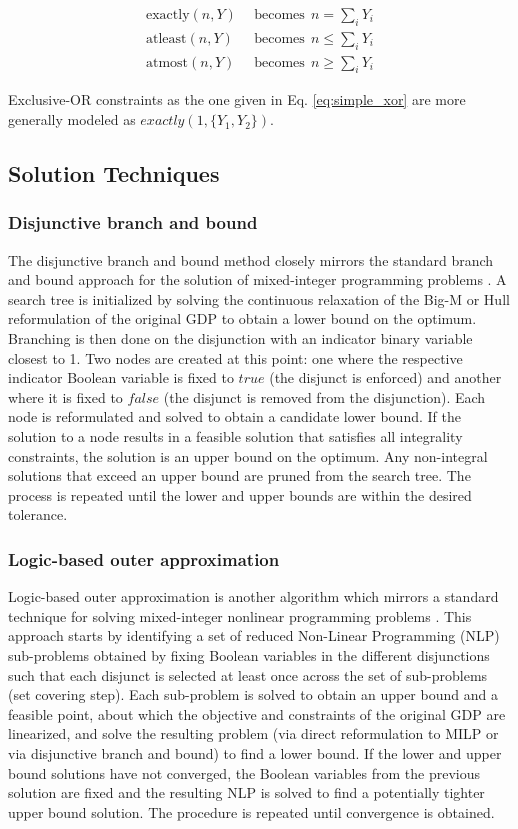 \documentclass{juliacon}
\begin{document}
\begin{align*}
    \text{exactly}(n, Y) & \ \ \text{becomes} \ \ n = \sum_i Y_i \\
    \text{atleast}(n, Y) &  \ \ \text{becomes} \ \ n \leq \sum_i Y_i \\
    \text{atmost}(n, Y) &  \ \ \text{becomes} \ \ n \geq \sum_i Y_i
\end{align*}

Exclusive-OR constraints as the one given in Eq. \eqref{eq:simple_xor} are more generally modeled as $exactly(1,\{Y_1,Y_2\})$.

\subsection{Solution Techniques}

\subsubsection{Disjunctive branch and bound}
The disjunctive branch and bound method closely mirrors the standard branch and bound approach for the solution of mixed-integer programming problems \cite{grossmann_lee_2003}. A search tree is initialized by solving the continuous relaxation of the Big-M or Hull reformulation of the original GDP to obtain a lower bound on the optimum. Branching is then done on the disjunction with an indicator binary variable closest to 1. Two nodes are created at this point: one where the respective indicator Boolean variable is fixed to $true$ (the disjunct is enforced) and another where it is fixed to $false$ (the disjunct is removed from the disjunction). Each node is reformulated and solved to obtain a candidate lower bound. If the solution to a node results in a feasible solution that satisfies all integrality constraints, the solution is an upper bound on the optimum. Any non-integral solutions that exceed an upper bound are pruned from the search tree. The process is repeated until the lower and upper bounds are within the desired tolerance.

\subsubsection{Logic-based outer approximation}
Logic-based outer approximation is another algorithm which mirrors a standard technique for solving mixed-integer nonlinear programming problems \cite{E.Grossmann2009}. This approach starts by identifying a set of reduced Non-Linear Programming (NLP) sub-problems obtained by fixing Boolean variables in the different disjunctions such that each disjunct is selected at least once across the set of sub-problems (set covering step). 
Each sub-problem is solved to obtain an upper bound and a feasible point, about which the objective and constraints of the original GDP are linearized, and solve the resulting problem (via direct reformulation to MILP or via disjunctive branch and bound) to find a lower bound. If the lower and upper bound solutions have not converged, the Boolean variables from the previous solution are fixed and the resulting NLP is solved to find a potentially tighter upper bound solution. The procedure is repeated until convergence is obtained.
\end{document}
